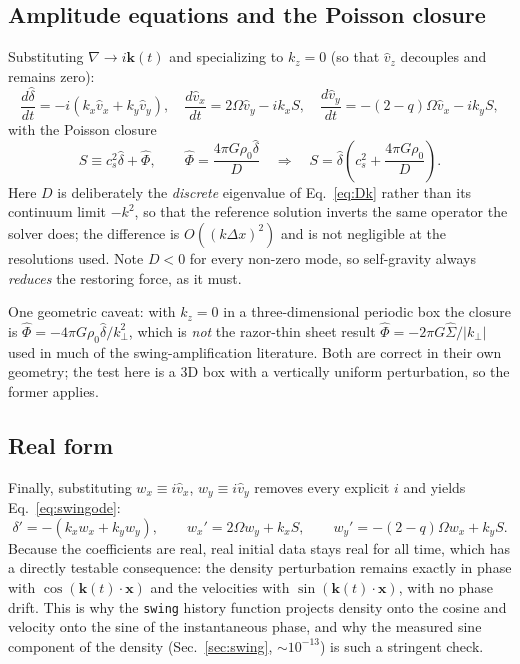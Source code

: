 \documentclass[11pt]{article}
\newcommand{\code}[1]{\texttt{#1}}
\begin{document}
\subsection{Amplitude equations and the Poisson closure}
Substituting $\nabla\to i\mathbf{k}(t)$ and specializing to $k_z=0$ (so that $\hat v_z$
decouples and remains zero):
\begin{equation}
  \frac{d\hat\delta}{dt} = -i(k_x\hat v_x + k_y\hat v_y),\quad
  \frac{d\hat v_x}{dt} = 2\Omega\hat v_y - ik_xS,\quad
  \frac{d\hat v_y}{dt} = -(2-q)\Omega\hat v_x - ik_yS,
\end{equation}
with the Poisson closure
\begin{equation}
  S \equiv c_s^2\hat\delta + \hat\Phi,
  \qquad
  \hat\Phi = \frac{4\pi G\rho_0\hat\delta}{D}
  \quad\Longrightarrow\quad
  S = \hat\delta\left(c_s^2 + \frac{4\pi G\rho_0}{D}\right).
\end{equation}
Here $D$ is deliberately the \emph{discrete} eigenvalue of Eq.~\eqref{eq:Dk} rather than
its continuum limit $-k^2$, so that the reference solution inverts the same operator the
solver does; the difference is $O((k\Delta x)^2)$ and is not negligible at the
resolutions used. Note $D<0$ for every non-zero mode, so self-gravity always
\emph{reduces} the restoring force, as it must.

One geometric caveat: with $k_z=0$ in a three-dimensional periodic box the closure is
$\hat\Phi = -4\pi G\rho_0\hat\delta/k_\perp^2$, which is \emph{not} the razor-thin sheet
result $\hat\Phi = -2\pi G\hat\Sigma/|k_\perp|$ used in much of the swing-amplification
literature. Both are correct in their own geometry; the test here is a 3D box with a
vertically uniform perturbation, so the former applies.

\subsection{Real form}
Finally, substituting $w_{x} \equiv i\hat v_{x}$, $w_{y} \equiv i\hat v_{y}$ removes
every explicit $i$ and yields Eq.~\eqref{eq:swingode}:
\begin{equation}
  \delta' = -(k_xw_x + k_yw_y), \qquad
  w_x' = 2\Omega w_y + k_xS, \qquad
  w_y' = -(2-q)\Omega w_x + k_yS .
\end{equation}
Because the coefficients are real, real initial data stays real for all time, which has
a directly testable consequence: the density perturbation remains exactly in phase with
$\cos(\mathbf{k}(t)\!\cdot\!\mathbf{x})$ and the velocities with
$\sin(\mathbf{k}(t)\!\cdot\!\mathbf{x})$, with no phase drift. This is why the
\code{swing} history function projects density onto the cosine and velocity onto the
sine of the instantaneous phase, and why the measured sine component of the density
(Sec.~\ref{sec:swing}, $\sim10^{-13}$) is such a stringent check.
\end{document}
